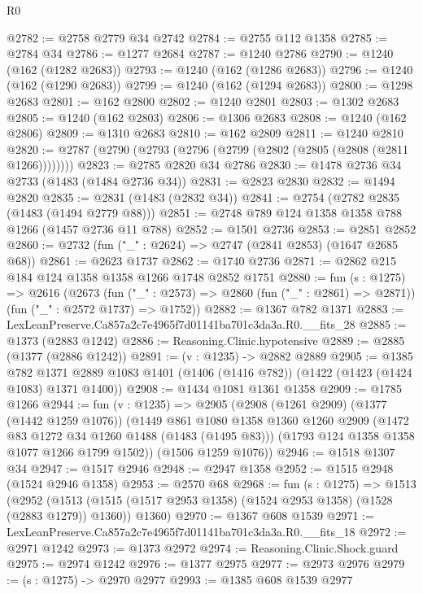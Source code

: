 \begin{lexlean}{R0}
\begin{coremodule}
@2782 := @2758 @2779 @34 @2742
@2784 := @2755 @112 @1358
@2785 := @2784 @34
@2786 := @1277 @2684
@2787 := @1240 @2786
@2790 := @1240 (@162 (@1282 @2683))
@2793 := @1240 (@162 (@1286 @2683))
@2796 := @1240 (@162 (@1290 @2683))
@2799 := @1240 (@162 (@1294 @2683))
@2800 := @1298 @2683
@2801 := @162 @2800
@2802 := @1240 @2801
@2803 := @1302 @2683
@2805 := @1240 (@162 @2803)
@2806 := @1306 @2683
@2808 := @1240 (@162 @2806)
@2809 := @1310 @2683
@2810 := @162 @2809
@2811 := @1240 @2810
@2820 := @2787 (@2790 (@2793 (@2796 (@2799 (@2802 (@2805 (@2808 (@2811 @1266))))))))
@2823 := @2785 @2820 @34 @2786
@2830 := @1478 @2736 @34 @2733 (@1483 (@1484 @2736 @34))
@2831 := @2823 @2830
@2832 := @1494 @2820
@2835 := @2831 (@1483 (@2832 @34))
@2841 := @2754 (@2782 @2835 (@1483 (@1494 @2779 @88)))
@2851 := @2748 @789 @124 @1358 @1358 @788 @1266 (@1457 @2736 @11 @788)
@2852 := @1501 @2736
@2853 := @2851 @2852
@2860 := @2732 (fun ("_" : @2624) => @2747 (@2841 @2853) (@1647 @2685 @68))
@2861 := @2623 @1737
@2862 := @1740 @2736
@2871 := @2862 @215 @184 @124 @1358 @1358 @1266 @1748 @2852 @1751
@2880 := fun (s : @1275) =>
  @2616
    (@2673
      (fun ("_" : @2573) => @2860 (fun ("_" : @2861) => @2871))
      (fun ("_" : @2572 @1737) => @1752))
@2882 := @1367 @782 @1371
@2883 := LexLeanPreserve.Ca857a2c7e4965f7d01141ba701c3da3a.R0.__fits_28
@2885 := @1373 (@2883 @1242)
@2886 := Reasoning.Clinic.hypotensive
@2889 := @2885 (@1377 (@2886 @1242))
@2891 := (v : @1235) -> @2882 @2889
@2905 := @1385
    @782
    @1371
    @2889
    @1083
    @1401
    (@1406 (@1416 @782))
    (@1422 (@1423 (@1424 @1083) @1371 @1400))
@2908 := @1434 @1081 @1361 @1358
@2909 := @1785 @1266
@2944 := fun (v : @1235) =>
  @2905
    (@2908
      (@1261 @2909)
      (@1377 (@1442 @1259 @1076))
      (@1449
        @861
        @1080
        @1358
        @1360
        @1260
        @2909
        (@1472 @83 @1272 @34 @1260 @1488 (@1483 (@1495 @83)))
        (@1793 @124 @1358 @1358 @1077 @1266 @1799 @1502))
      (@1506 @1259 @1076))
@2946 := @1518 @1307 @34
@2947 := @1517 @2946
@2948 := @2947 @1358
@2952 := @1515 @2948 (@1524 @2946 @1358)
@2953 := @2570 @68
@2968 := fun (s : @1275) =>
  @1513
    (@2952
      (@1513 (@1515 (@1517 @2953 @1358) (@1524 @2953 @1358) (@1528 (@2883 @1279)) @1360))
      @1360)
@2970 := @1367 @608 @1539
@2971 := LexLeanPreserve.Ca857a2c7e4965f7d01141ba701c3da3a.R0.__fits_18
@2972 := @2971 @1242
@2973 := @1373 @2972
@2974 := Reasoning.Clinic.Shock.guard
@2975 := @2974 @1242
@2976 := @1377 @2975
@2977 := @2973 @2976
@2979 := (s : @1275) -> @2970 @2977
@2993 := @1385
    @608
    @1539
    @2977

\end{coremodule}
\end{lexlean}
